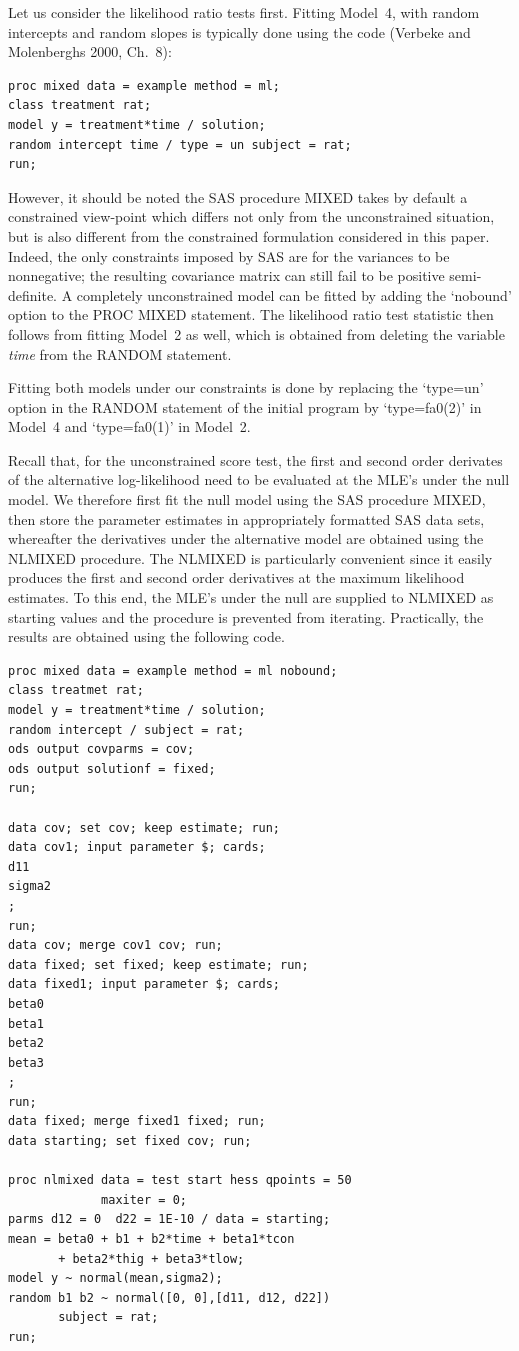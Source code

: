 \documentclass[useAMS,usenatbib,referee]{biom}
\begin{document}
Let us consider the likelihood ratio tests first.  Fitting Model~4,
with random intercepts and random slopes is typically done using the
code (Verbeke and Molenberghs 2000, Ch.~8):
\begin{verbatim}
proc mixed data = example method = ml;
class treatment rat;
model y = treatment*time / solution;
random intercept time / type = un subject = rat;
run;
\end{verbatim}
However, it should be noted the SAS procedure MIXED takes by default a
constrained view-point which differs not only from the unconstrained
situation, but is also different from the constrained formulation
considered in this paper. Indeed, the only constraints imposed by SAS
are for the variances to be nonnegative; the resulting covariance
matrix can still fail to be positive semi-definite. A completely
unconstrained model can be fitted by adding the `nobound' option to
the PROC MIXED statement. The likelihood ratio test statistic then
follows from fitting Model~2 as well, which is obtained from deleting
the variable {\em time\/} from the RANDOM statement.

Fitting both models under our constraints is done by replacing the
`type=un' option in the RANDOM statement of the initial program by
`type=fa0(2)' in Model~4 and `type=fa0(1)' in Model~2.


Recall that, for the unconstrained score test, the first and second
order derivates of the alternative log-likelihood need to be evaluated
at the MLE's under the null model. We therefore first fit the null
model using the SAS procedure MIXED, then store the parameter
estimates in appropriately formatted SAS data sets, whereafter the
derivatives under the alternative model are obtained using the NLMIXED
procedure. The NLMIXED is particularly convenient since it easily
produces the first and second order derivatives at the maximum
likelihood estimates. To this end, the MLE's under the null are
supplied to NLMIXED as starting values and the procedure is prevented
from iterating. Practically, the results are obtained using the
following code.
\begin{verbatim}
proc mixed data = example method = ml nobound;
class treatmet rat;
model y = treatment*time / solution;
random intercept / subject = rat;
ods output covparms = cov;
ods output solutionf = fixed;
run;

data cov; set cov; keep estimate; run;
data cov1; input parameter $; cards; 
d11 
sigma2
; 
run;
data cov; merge cov1 cov; run;
data fixed; set fixed; keep estimate; run;
data fixed1; input parameter $; cards;
beta0
beta1
beta2
beta3
;
run;
data fixed; merge fixed1 fixed; run;
data starting; set fixed cov; run;

proc nlmixed data = test start hess qpoints = 50 
             maxiter = 0;
parms d12 = 0  d22 = 1E-10 / data = starting;
mean = beta0 + b1 + b2*time + beta1*tcon 
       + beta2*thig + beta3*tlow;
model y ~ normal(mean,sigma2);
random b1 b2 ~ normal([0, 0],[d11, d12, d22]) 
       subject = rat;
run;
\end{verbatim}
\end{document}
